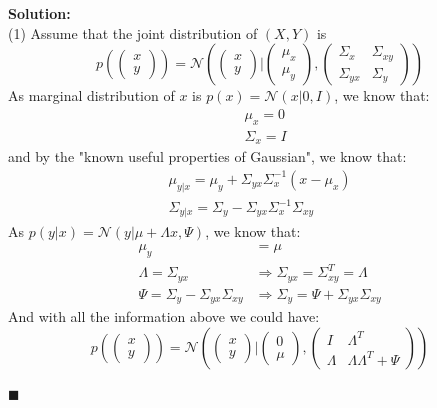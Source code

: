 \documentclass{article}
\newenvironment{solution}                               %
{\textbf{Solution:} \\}{$\blacksquare$\newline}         %
\newcommand{\leadto}{\Rightarrow}                       %
\newcommand{\Gaussian}{\mathcal{N}}                     %
\newcommand{\IdenMat}{\textit{I}}                       %
\begin{document}
    \begin{solution}
        (1) Assume that the joint distribution of $(X, Y)$ is
        $$
        p(\begin{pmatrix}
            x \\ y
        \end{pmatrix}) = 
        \Gaussian(
            \begin{pmatrix}
                x \\ y
            \end{pmatrix}
            | 
            \begin{pmatrix}
                \mu_x \\ \mu_y
            \end{pmatrix}, 
            \begin{pmatrix}
                \Sigma_{x} & \Sigma_{xy} \\
                \Sigma_{yx} & \Sigma_{y}
            \end{pmatrix}
        )
        $$
        As marginal distribution of $x$ is $p(x) = \Gaussian(x | 0, \IdenMat)$, we know that: 
        \begin{align*}
            & \mu_x = 0 \\
            & \Sigma_{x} = \IdenMat
        \end{align*}
        and by the "known useful properties of Gaussian", we know that:
        \begin{align*}
            \mu_{y|x} = \mu_y + \Sigma_{yx} \Sigma_{x}^{-1}(x - \mu_x) \\
            \Sigma_{y|x} = \Sigma_{y} - \Sigma_{yx} \Sigma_{x}^{-1} \Sigma_{xy}
        \end{align*}
        As $p(y|x) = \Gaussian(y | \mu+\Lambda x, \Psi)$, we know that:
        \begin{align*}
            \mu_y &= \mu \\
            \Lambda = \Sigma_{yx} 
                &\leadto \Sigma_{yx}=\Sigma_{xy}^T=\Lambda\\
            \Psi = \Sigma_{y} - \Sigma_{yx} \Sigma_{xy}
                &\leadto \Sigma_{y} = \Psi + \Sigma_{yx} \Sigma_{xy}
        \end{align*}
        And with all the information above we could have:
        $$
        p(
            \begin{pmatrix}
                x \\ y
            \end{pmatrix}
        ) = 
        \Gaussian(
            \begin{pmatrix}
                x \\ y
            \end{pmatrix}
            |
            \begin{pmatrix}
                0 \\ \mu
            \end{pmatrix}
            ,
            \begin{pmatrix}
                \IdenMat & \Lambda^T \\
                \Lambda & \Lambda \Lambda^T + \Psi
            \end{pmatrix}
        )
        $$


\end{solution}
\end{document}
